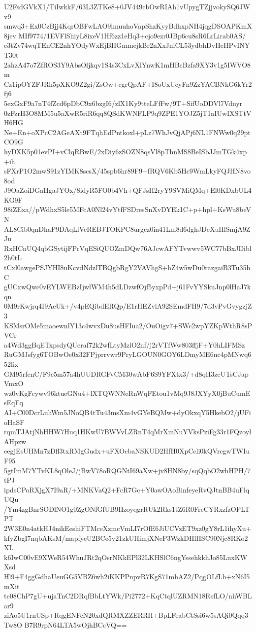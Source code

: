 U2FsdGVkX1/TiIwkkF/63L3ZTKe8+0JV449cbOwRIAh1vUpygTZjjvokySQ6JWv9
smwq3+Ex0CzBjj4KqrOBFwLAO9lmuuhoVapShzKyyBdhxpNH4jqgDSOAPKmX8jev
MIf9774/1EVFlShiyL8ixeV1Hf6zz1eHq3+cjo9ezr0JBp6cu8sR6LrLirab0AS/
c3tZv74wqTEnCE2nhYOdyWxEjBHGmmejkBr2nXxJniCL53ydbhDvHeHPvINYT30t
2ahzA47o7ZfROS3Y9AbsOljkqv1S4s3CxLvXlYnwK1mHBcBzfa9XY3v1g5IWVO8m
Cz1ipOYZFJRh5pXKO9Z2gi/ZsOw+cgrQpAF+I8oUxUcyFn9ZzYACBNkG6kYr2fj6
5exGxF9a7nT4fZcd6pDbC9x6bzgI6/zlX1Ky9tteLFfFw/9T+SifUoDDVl7Vdnyr
0zFzrH3O8MM5u5aXwR5riR6qq8QSdKWNFLP9q9ZPE1YOJZ5jT1aIUwIXSTtVH6HG
Ne+En+oXPcC2AGeAXt9FTqhEdPntkoxl+pLz7WhJvQjAPj6NL1FNWw0q29ptCO9G
hyDXK5p01evPI+vClqRBwE/2xDiy6zSOZN8qsVl8pThnMS8BeISbJJmTGk4xp+ih
sFXrP1O2mwS91zYIMK8scsX/45spb6hr89F9+fRQV6Kb5Hc9WmLkyFQJHN8vo8od
J9OaZoiDGaHgaJYOx/8idyR5FO0b4Vh+QFJsH2ryY9SVMiQMq+El0KDxbUL4KG9F
98iZExa//pWdhxS5le5MFcA0Nl24vYtfFSDresSnXvDYEk1C+p+hpl+KsWu8beVN
AL8Cib0qnDhaP9DAqLlVeREBJTOKPC8urgcz0in41Lm8d6dghJDeXuHlSmjA9ZJu
RxHCnUQ4qbGSytijFPrVqESiQUOZmDQw76AJcwAFYTvwwv5WC77bBxJDibl2h0tL
tCxl0awgePSJYHI8uKcvdNdzlTBQgbRgY2VAVhgS+hZ4w5wDu0razgaiB3Tu35hC
gUCxwQwc0vEYLWEBzIjwlWM4h5dLDzwfOjf5yxpPd+j61FvYYSkuJnp0lHaJ7kqn
0M9rKwjrq4I9AeUk+/v4pEQibdERQp/E1rHEZvlA92SEmdFH9/7d3vPvGvygzjZ3
KSMsrOMe5maoewnlY13c4wvxDu8usHFIua2/OuOigv7+SWc2wpYZKpWthR8sPVCr
a4Wd3ggBqETxpsdyQUeraf72k2wfLtyMzlO2nf/j2rVTfWw803ffjF+Y0hLIFMSz
RuGMJsfyg6TOBwOe0x32FPjprrvwr9PryLGOUN0GOY6LDmyME6nc4pMNwq652lix
GM95rfcnC/F9c5m57a4hUUDRGFvCM30wAbF6S9YFXtx3/+d8qH3zeUTsCJapVmxO
wz0vKgFcywv96ktueGNu4+lXTQWNNeRnWqFEtou1vMq9J8JXYyX0jBuCumEsEqFq
AI+C00DcrLuhWm5JNoQB4tTu43msXm4vGYeBQMw+dyOkxqY5HkebO2/jUFioHaSF
rqmTJAtjNhHHW7Huq1HKwU7BWVvLZRnT4qMrXmNuYVksPziFg33r1FQzoylAHpzw
eegjEsUHMn7zDfl3txRMgGudx+uFXOcbaNSKUD2HfH0XpCcli0kQVrcgwTWIuF95
5gtImM7YTvKL8qOleJ/jBwV78oRQGNtI69aXw+jv8HN8by/sqQqbO2whHPH/7tPJ
ipdsCPoRXjgX7I9aR/+MNKVaQ2+FcR7Gc+Y0awOAoBinfeyeRvQJtnBB4uFlqUQu
/Ym4zgBnrSODlNO1g0ZgONfGfUB9HzoyqgrRUk2Rks1tZ6R0FrcCYRxzfzOPLTPT
2W3E0n4atkHJ4nikEeshiFTMceXzmcVmLI7rOfE6JiUCVzET9xz0gY8rL1ihyXu+
kfyZbgI7nqbAKsM/mapfyeU2BCe5y21zkUHimjXNeP3WzkDHlHSC90Njc8RKo2XL
k6IwC00vE9XWeR54WhuJRt2qOsrNKkEPl32LKHSlC6ngYssehkkhJo85LnxKWXsd
Hl9+F4ggGdhaUeuGG5VBZ6wh2iKKPPnpvR7KgS71mhAZ2/PqgOLfLh+xN6I5mXit
te08ChP7gU+ujaTnC2DRqfBbLtYWk/Pi2772+KqCtqlUZRMN18RsfLO/nhWBLar9
ziAo5U1rnUSp+RqgENFcN20xdQRMXZZERRH+BpLFeabCtSsi6w5sAQi0Qqq3Tw8O
B7R9rpN64LTA5wOjhBCcVQ==
